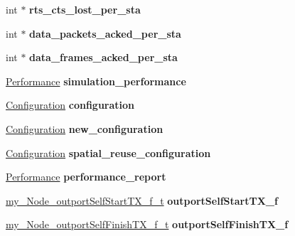 \begin{DoxyCompactItemize}
int $\ast$ {\bfseries rts\+\_\+cts\+\_\+lost\+\_\+per\+\_\+sta}
\item 
\mbox{\label{classcompcxx__Node__23_a796c1989295021c9694e1d521daef020}} 
int $\ast$ {\bfseries data\+\_\+packets\+\_\+acked\+\_\+per\+\_\+sta}
\item 
\mbox{\label{classcompcxx__Node__23_a1d29a7772a4f417c8acbd985a3733a98}} 
int $\ast$ {\bfseries data\+\_\+frames\+\_\+acked\+\_\+per\+\_\+sta}
\item 
\mbox{\label{classcompcxx__Node__23_a8adf1649af4b8d2494394e07bdac7cb4}} 
\hyperlink{structPerformance}{Performance} {\bfseries simulation\+\_\+performance}
\item 
\mbox{\label{classcompcxx__Node__23_a0b63ff86ae83c4af5fd16cd4643e04b8}} 
\hyperlink{structConfiguration}{Configuration} {\bfseries configuration}
\item 
\mbox{\label{classcompcxx__Node__23_af4936d6a236222a0ddafcdb8d2606d3d}} 
\hyperlink{structConfiguration}{Configuration} {\bfseries new\+\_\+configuration}
\item 
\mbox{\label{classcompcxx__Node__23_ab548c24bf9b8699f333aadfc5e5e2c12}} 
\hyperlink{structConfiguration}{Configuration} {\bfseries spatial\+\_\+reuse\+\_\+configuration}
\item 
\mbox{\label{classcompcxx__Node__23_a1ee98987f693d9ef2de70af0825b0750}} 
\hyperlink{structPerformance}{Performance} {\bfseries performance\+\_\+report}
\item 
\mbox{\label{classcompcxx__Node__23_afb67ced1dc09389f592e6ee177995754}} 
\hyperlink{classcompcxx__Node__23_1_1my__Node__outportSelfStartTX__f__t}{my\+\_\+\+Node\+\_\+outport\+Self\+Start\+T\+X\+\_\+f\+\_\+t} {\bfseries outport\+Self\+Start\+T\+X\+\_\+f}
\item 
\mbox{\label{classcompcxx__Node__23_a677d0ef2adcb6730c7cef02f0e507417}} 
\hyperlink{classcompcxx__Node__23_1_1my__Node__outportSelfFinishTX__f__t}{my\+\_\+\+Node\+\_\+outport\+Self\+Finish\+T\+X\+\_\+f\+\_\+t} {\bfseries outport\+Self\+Finish\+T\+X\+\_\+f}

\end{DoxyCompactItemize}
